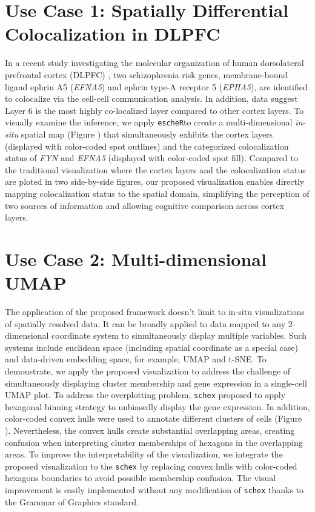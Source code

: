 \documentclass[11pt]{article}
\newcommand{\coloc}{\texttt{escheR}}
\begin{document}
\section*{Use Case 1: Spatially Differential Colocalization in DLPFC}
In a recent study investigating the molecular organization of human dorsolateral prefrontal cortex (DLPFC) \cite{huukimyers_2023}, two schizophrenia risk genes, membrane-bound ligand ephrin A5 (\textit{EFNA5}) and ephrin type-A receptor 5 (\textit{EPHA5}), are identified to colocalize via the cell-cell communication analysis. In addition, data suggest Layer 6 is the most highly co-localized layer compared to other cortex layers. To visually examine the inference, we apply \coloc to create a multi-dimensional \textit{in-situ} spatial map (Figure \label{fig:visual}) that simultaneously exhibits the cortex layers (displayed with color-coded spot outlines) and the categorized colocalization status of \textit{FYN} and \textit{EFNA5} (displayed with color-coded spot fill). Compared to the traditional visualization where the cortex layers and the colocalization status are ploted in two side-by-side figures, our proposed visualization enables directly mapping colocalization status to the spatial domain, simplifying the perception of two sources of information and allowing cognitive comparison across cortex layers. 

\section*{Use Case 2: Multi-dimensional UMAP}
The application of the proposed framework doesn't limit to in-situ visualizations of spatially resolved data. It can be broadly applied to data mapped to any 2-dimensional coordinate system to simultaneously display multiple variables. Such systems include euclidean space (including spatial coordinate as a special case) and data-driven embedding space, for example, UMAP and t-SNE. To demonstrate, we apply the proposed visualization to address the challenge of simultaneously displaying cluster membership and gene expression in a single-cell UMAP plot. To address the overplotting problem, \texttt{schex} proposed to apply hexagonal binning strategy to unbiasedly display the gene expression.\cite{freytag_2020} In addition, color-coded convex hulls were used to annotate different clusters of cells (Figure \label{fig:visual}). Nevertheless, the convex hulls create substantial overlapping areas, creating confusion when interpreting cluster memberships of hexagons in the overlapping areas. To improve the interpretability of the visualization, we integrate the proposed visualization to the \texttt{schex} by replacing convex hulls with color-coded hexagons boundaries to avoid possible membership confusion. The visual improvement is easily implemented without any modification of \texttt{schex} thanks to the Grammar of Graphics \cite{wilkinson_2012} standard.
\end{document}
